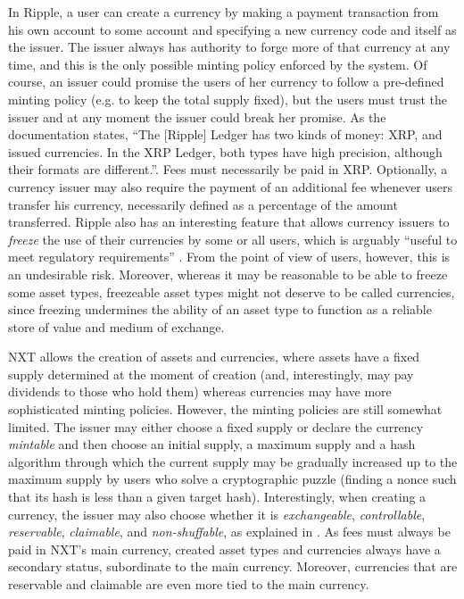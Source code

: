 \documentclass{llncs}
\begin{document}
In Ripple, a user can create a currency by making a payment transaction from his own account to some account and specifying a new currency code and itself as the issuer. The issuer always has authority to forge more of that currency at any time, and this is the only possible minting policy enforced by the system. Of course, an issuer could promise the users of her currency to follow a pre-defined minting policy (e.g. to keep the total supply fixed), but the users must trust the issuer and at any moment the issuer could break her promise. As the documentation \cite{RippleCurrencyFormat} states, ``The [Ripple] Ledger has two kinds of money: XRP, and issued currencies. In the XRP Ledger, both types have high precision, although their formats are different.''. Fees must necessarily be paid in XRP. Optionally, a currency issuer may also require the payment of an additional fee whenever users transfer his currency, necessarily defined as a percentage of the amount transferred. Ripple also has an interesting feature that allows currency issuers to \emph{freeze} the use of their currencies by some or all users, which is arguably ``useful to meet regulatory requirements'' \cite{RippleFreeze}. From the point of view of users, however, this is an undesirable risk. Moreover, whereas it may be reasonable to be able to freeze some asset types, freezeable asset types might not deserve to be called currencies, since freezing undermines the ability of an asset type to function as a reliable store of value and medium of exchange.

NXT allows the creation of assets and currencies, where assets have a fixed supply determined at the moment of creation (and, interestingly, may pay dividends to those who hold them) whereas currencies may have more sophisticated minting policies. However, the minting policies are still somewhat limited. The issuer may either choose a fixed supply or declare the currency \emph{mintable} and then choose an initial supply, a maximum supply and a hash algorithm through which the current supply may be gradually increased up to the maximum supply by users who solve a cryptographic puzzle (finding a nonce such that its hash is less than a given target hash). Interestingly, when creating a currency, the issuer may also choose whether it is \emph{exchangeable}, \emph{controllable}, \emph{reservable}, \emph{claimable}, and \emph{non-shuffable}, as explained in \cite{NXTCurrencyProperties}. As fees must always be paid in NXT's main currency, created asset types and currencies always have a secondary status, subordinate to the main currency. Moreover, currencies that are reservable and claimable are even more tied to the main currency.
\end{document}
